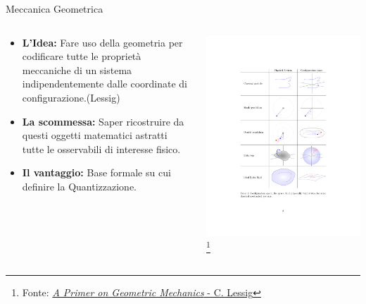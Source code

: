 \documentclass[8pt,handout]{beamer}
\begin{document}
		\begin{frame}{Meccanica Geometrica}
  			\begin{columns}[T]
    			\begin{column}{.5\textwidth}		
					\begin{itemize}
						\item \textbf{L'Idea:} Fare uso della geometria per codificare tutte le proprietà meccaniche di un sistema indipendentemente dalle coordinate di configurazione.(Lessig)
						\item \textbf{La scommessa:} Saper ricostruire da questi oggetti matematici astratti tutte le osservabili di interesse fisico.
						\item \textbf{Il vantaggio:} Base formale su cui definire la Quantizzazione.
					\end{itemize}
    			\end{column}
    		   	\begin{column}{.5\textwidth}
							\includegraphics[width=\textwidth]{Presentazione/GeoMec_Crop} 		
							 \center \footnote{Fonte: 
 								\href{http://arxiv.org/abs/1206.3302}{\emph{A Primer on Geometric Mechanics} - C. Lessig}
  							}	
    			\end{column}
  			\end{columns}	
	\end{frame}
\end{document}
